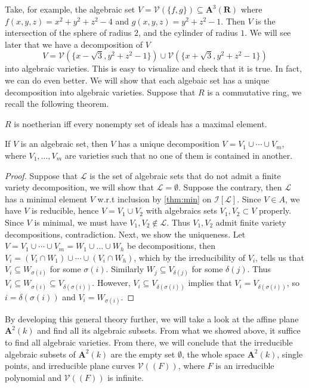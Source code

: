 \documentclass[11pt]{book}
\begin{document}
Take, for example, the algebraic set $V=\mathcal{V}(\{f,g\})\subseteq \mathbf A^3(\mathbf R)$ where $f(x,y,z)=x^2+y^2+z^2-4$ and $g(x,y,z)=y^2+z^2-1$. Then $V$ is the intersection of the sphere of radius $2$, and the cylinder of radius $1$. We will see later that we have a decomposition of $V$
\[V=\mathcal{V}(\{x-\sqrt{3},y^2+z^2-1\})\cup \mathcal{V}(\{x+\sqrt{3},y^2+z^2-1\})\]
into algebraic varieties. This is easy to visualize and check that it is true. In fact, we can do even better. We will show that each algebaic set has a unique decomposition into algebraic varieties. Suppose that $R$ is a commutative ring, we recall the following theorem.
\begin{theorem}\label{thm:min}$R$ is noetherian iff every nonempty set of ideals has a maximal element.
\end{theorem}
\begin{theorem}If $V$ is an algebraic set, then $V$ has a unique decomposition $V=V_1\cup\cdots\cup V_m$, where $V_1,\dots,V_m$ are varieties such that no one of them is contained in another.
\begin{proof}
Suppose that $\mathcal{L}$ is the set of algebraic sets that do not admit a finite variety decomposition, we will show that $\mathcal{L}=\emptyset$. Suppose the contrary, then $\mathcal{L}$ has a minimal element $V$ w.r.t inclusion by \autoref{thm:min} on $\mathcal{I}[\mathcal{L}]$. Since $V\in A$, we have $V$ is reducible, hence $V=V_1\cup V_2$ with algebraics sets $V_1,V_2\subset V$ properly. Since $V$ is minimal, we must have $V_1,V_2\not\in \mathcal{L}$. Thus $V_1,V_2$ admit finite variety decompositions, contradiction. Next, we show the uniqueness. Let $V=V_1\cup\cdots\cup V_m=W_1\cup\dots\cup W_h$ be decompositions, then $V_i=(V_i\cap W_1)\cup\cdots\cup (V_i\cap W_h)$, which by the irreducibility of $V_i$, tells us that $V_i\subseteq W_{\sigma(i)}$ for some $\sigma(i)$. Similarly $W_j\subseteq V_{\delta(j)}$ for some $\delta(j)$. Thus $V_i\subseteq W_{\sigma(i)}\subseteq V_{\delta(\sigma(i))}$. However, $V_i\subseteq V_{\delta(\sigma(i))}$ implies that $V_i=V_{\delta(\sigma(i))}$, so $i=\delta(\sigma(i))$ and $V_i=W_{\sigma(i)}$. 
\end{proof}
\end{theorem}
By developing this general theory further, we will take a look at the affine plane $\mathbf A^2(k)$ and find all its algebraic subsets. From what we showed above, it suffice to find all algebraic varieties. From there, we will conclude that the irreducible algebraic subsets of $\mathbf A^2(k)$ are the empty set $\emptyset$, the whole space $\mathbf A^2(k)$, single points, and irreducible plane curves $\mathcal{V}((F))$, where $F$ is an irreducible polynomial and $\mathcal{V}((F))$ is infinite.
\end{document}
